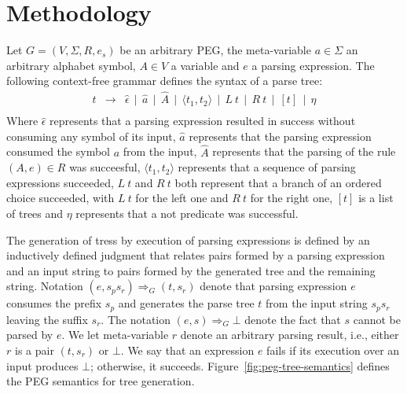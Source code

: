 \chapter{Methodology}\label{chap:methodology}


Let \(G = (V, \Sigma, R, e_s)\) be an arbitrary PEG, the meta-variable \(a \in \Sigma\) an
arbitrary alphabet symbol, \(A \in V\) a variable and \(e\) a parsing expression.
The following context-free grammar defines the syntax of a parse tree:
\[
   \begin{array}{lcl}
      t & \to & \hat{\epsilon} \, \mid \, \hat{a} \, \mid \, \hat{A} \, 
                    \mid \, \langle t_1, t_2 \rangle\,
                    \mid \, L \: t \, \mid \, R \: t \, \mid \, [t] \, 
                    \mid \, \eta \\
   \end{array}
\]
Where \(\hat{\epsilon}\) represents that a parsing expression resulted in 
success without consuming any symbol of its input, \(\hat{a}\) represents that
the parsing expression consumed the symbol \(a\) from the input, \(\hat{A}\)
represents that the parsing of the rule \((A, e) \in R\) was succeesful, 
\(\langle t_1, t_2 \rangle\) represents that a sequence of parsing expressions 
succeeded, 
\(L \: t\) and \(R \: t\) both represent that a branch of an ordered choice succeeded, 
with \(L \: t\) for the left one and \(R \: t\) for the right one,
\([t]\) is a list of trees and \(\eta\) represents that a not 
predicate was successful.

The generation of tress by execution of parsing expressions is defined by an 
inductively defined judgment that relates pairs formed by a parsing expression 
and an input string to pairs formed by the generated tree and the remaining string.
Notation \((e,s_ps_r) \Rightarrow_G (t,s_r)\) denote that parsing expression \(e\)
consumes the prefix \(s_p\) and generates the parse tree \(t\) from the input string
\(s_ps_r\) leaving the suffix \(s_r\). The notation \((e,s) \Rightarrow_G \bot\) 
denote the fact that \(s\) cannot be parsed by \(e\). We let meta-variable \(r\) 
denote an arbitrary parsing result, i.e., either \(r\) is a pair \((t,s_r)\) or 
\(\bot\). We say that an expression \(e\) fails if its execution over an input 
produces \(\bot\); otherwise, it succeeds. Figure~\ref{fig:peg-tree-semantics} 
defines the PEG semantics for tree generation.

